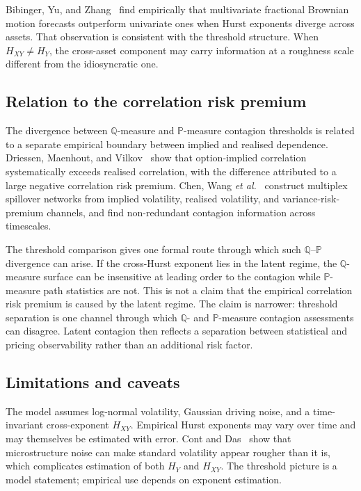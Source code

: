 \documentclass[11pt,a4paper]{amsart}
\theoremstyle{plain}
\theoremstyle{definition}
\theoremstyle{remark}
\newcommand{\Q}{\mathbb{Q}}
\newcommand{\PP}{\mathbb{P}}
\begin{document}
Bibinger, Yu, and Zhang~\cite{BYZ25} find empirically that multivariate fractional Brownian motion
forecasts outperform univariate ones when Hurst exponents diverge across assets.  That observation
is consistent with the threshold structure.  When $H_{XY}\ne H_Y$, the cross-asset component may
carry information at a roughness scale different from the idiosyncratic one.

\subsection{Relation to the correlation risk premium}

The divergence between $\Q$-measure and $\PP$-measure contagion thresholds is related to a
separate empirical boundary between implied and realised dependence.  Driessen, Maenhout, and
Vilkov~\cite{DMV09} show that option-implied correlation systematically exceeds realised
correlation, with the difference attributed to a large negative correlation risk premium.  Chen,
Wang \emph{et al.}~\cite{CWZL23} construct multiplex spillover networks from implied volatility,
realised volatility, and variance-risk-premium channels, and find non-redundant contagion
information across timescales.

The threshold comparison gives one formal route through which such $\Q$--$\PP$ divergence can
arise.  If the cross-Hurst exponent lies in the latent regime, the $\Q$-measure surface can be
insensitive at leading order to the contagion while $\PP$-measure path statistics are not.  This is
not a claim that the empirical correlation risk premium is caused by the latent regime.  The claim
is narrower: threshold separation is one channel through which $\Q$- and $\PP$-measure contagion
assessments can disagree.  Latent contagion then reflects a separation between statistical and
pricing observability rather than an additional risk factor.

\subsection{Limitations and caveats}

The model assumes log-normal volatility, Gaussian driving noise, and a time-invariant cross-exponent
\(H_{XY}\).  Empirical Hurst exponents may vary over time and may themselves be estimated with
error.  Cont and Das~\cite{CD24} show that microstructure noise can make standard volatility appear
rougher than it is, which complicates estimation of both \(H_Y\) and \(H_{XY}\).  The threshold
picture is a model statement; empirical use depends on exponent estimation.
\end{document}
